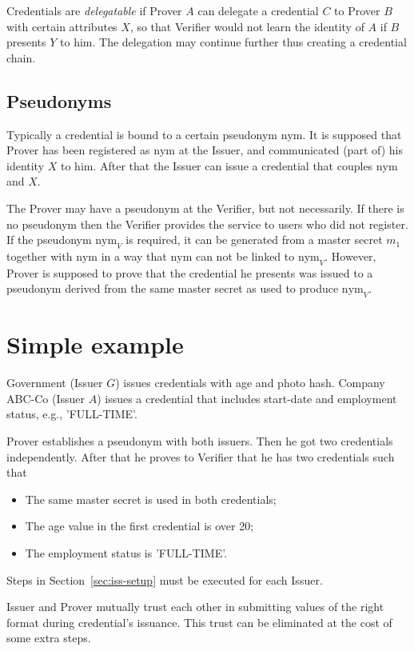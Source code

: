 \documentclass[a4paper]{article}
\begin{document}
Credentials are \emph{delegatable} if Prover $A$ can delegate a credential $C$ to Prover $B$ with certain attributes $X$, so that Verifier would not learn the identity of $A$ if $B$ presents $Y$ to him. The delegation may continue further thus creating a credential chain. 

\subsection{Pseudonyms}
Typically a credential is bound to a certain pseudonym $\mathrm{nym}$. It is supposed that Prover has been registered as $\mathrm{nym}$ at the Issuer, and communicated (part of) his identity $X$ to him. After  that the Issuer can issue a credential that couples $\mathrm{nym}$ and $X$. 

The Prover may have a pseudonym at the Verifier, but not necessarily. If there is no pseudonym then the Verifier provides the service to users who did not register. If the pseudonym $\mathrm{nym}_V$ is required, it can be generated from a master secret $m_1$ together with $\mathrm{nym}$ in a way that $\mathrm{nym}$ can not be linked to $\mathrm{nym}_V$. However, Prover is supposed to prove that the credential  he presents was issued to a pseudonym derived from the same master secret as used to produce $\mathrm{nym}_V$.

\section{Simple example}

 Government (Issuer $G$) issues credentials with age and photo hash. Company ABC-Co (Issuer $A$) issues a credential that includes start-date and employment status, e.g., 'FULL-TIME'.
 
Prover establishes a pseudonym with both issuers. Then he got two credentials independently. After that he proves
to Verifier that he has two credentials such that
\begin{itemize}
\item The same master secret is used in both credentials;
\item The age value in the first credential is over 20;
\item The employment status is 'FULL-TIME'.
\end{itemize}

Steps in Section~\ref{sec:iss-setup} must be executed for each Issuer.

Issuer and Prover mutually trust each other in submitting values of the right format
during credential's issuance. This trust can be eliminated at the cost of some extra steps.
\end{document}
